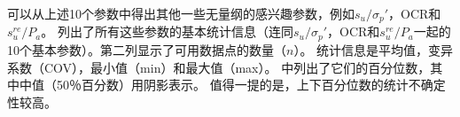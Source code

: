 \begin{paracol}{2}
    \switchcolumn
    
    可以从上述10个参数中得出其他一些无量纲的感兴趣参数，例如$s_u/\sigma_p'$，OCR和$s_u^{re}/P_a$。 列出了所有这些参数的基本统计信息（连同$s_u/\sigma_p'$，OCR和$s_u^{re}/P_a$一起的10个基本参数）。第二列显示了可用数据点的数量（$n$）。 统计信息是平均值，变异系数（COV），最小值（min）和最大值（max）。 中列出了它们的百分位数，其中中值（50％百分数）用阴影表示。 值得一提的是，上下百分位数的统计不确定性较高。
    
    
    \switchcolumn*
    
\end{paracol}

